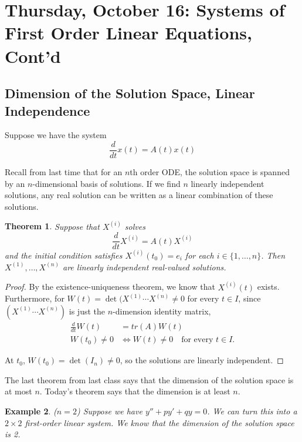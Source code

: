 \documentclass{tufte-handout}
\newtheorem{thm}{Theorem}[subsection]
\newtheorem{ex}[thm]{Example}
\theoremstyle{definition}
\begin{document}
\section{Thursday, October 16: Systems of First Order Linear Equations, Cont'd}
\subsection{Dimension of the Solution Space, Linear Independence}

Suppose we have the system
\begin{equation}
	\frac{d}{dt} x(t) = A(t) x(t) \label{eq:10161}
\end{equation}


Recall from last time that for an $n$th order ODE, the solution space is spanned by an $n$-dimensional basis of solutions. If we find $n$ linearly independent solutions, any real solution can be written as a linear combination of these solutions.

\begin{thm}
	Suppose that $X^{(i)}$ solves \[
		\frac{d}{dt} X^{(i)} = A(t) X^{(i)}
	\] and the initial condition satisfies $X^{(i)}(t_0) = e_i$ for each $i \in \{1,\ldots,n\}$. Then $X^{(1)},\ldots,X^{(n)}$ are linearly independent real-valued solutions.
\end{thm}

\begin{proof}
	By the existence-uniqueness theorem, we know that $X^{(i)}(t)$ exists. Furthermore, for $W(t) = \det (X^{(1)} \cdots X^{(n)} \ne 0$ for every $t \in I$, since $(X^{(1)} \cdots X^{(n)})$ is just the $n$-dimension identity matrix,
	\begin{align*}
		\frac{d}{dt}W(t) &= tr(A) W(t) \\
		W(t_0) \ne 0 &\iff W(t) \ne 0 \quad \text{for every } t \in I
	.\end{align*}

	At $t_0$, $W(t_0) = \det\left( I_n \right) \ne 0$, so the solutions are linearly independent.
\end{proof}

The last theorem from last class says that the dimension of the solution space is at most $n$. Today's theorem says that the dimension is at least $n$.
\begin{ex}
	($n=2$) Suppose we have $y'' + py' +qy = 0$. We can turn this into a $2 \times 2$ first-order linear system. We know that the dimension of the solution space is 2.
\end{ex}
\end{document}
